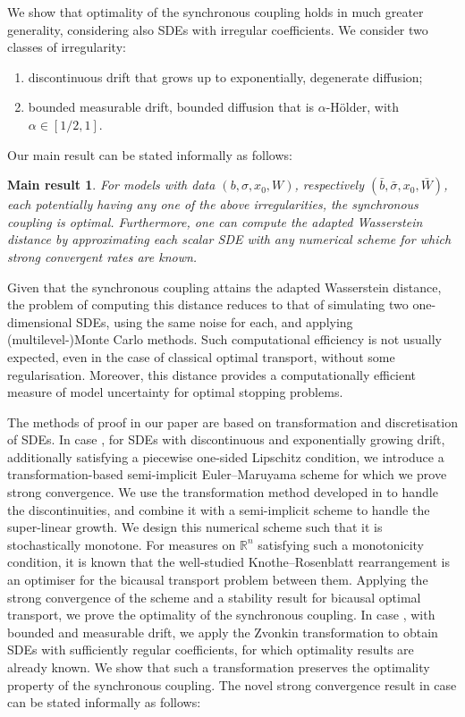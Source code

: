 \documentclass[onseside, final]{amsart}
\newtheorem*{mainresult*}{Main result}
\theoremstyle{definition}
\newcommand{\R}{\mathbb R}
\numberwithin{equation}{section}
\begin{document}
	We show that optimality of the synchronous coupling holds in much greater generality, considering also SDEs with irregular coefficients.
	We consider two classes of irregularity:
	\begin{enumerate}[label = (\arabic*)]
		\item \label{it:1} discontinuous drift that grows up to exponentially, degenerate diffusion;
		\item \label{it:2} bounded measurable drift, bounded diffusion that is $\alpha$-H\"older, with $\alpha \in [1/2,1]$.
	\end{enumerate}
	Our main result can be stated informally as follows:
	\begin{mainresult*}
		For models with data $(b,\sigma,x_0,W)$, respectively $(\bar b, \bar \sigma,x_0,\bar W)$, each potentially having any one of the above irregularities, the synchronous coupling is optimal. Furthermore, one can compute the adapted Wasserstein distance by approximating each scalar SDE with any numerical scheme for which strong convergent rates are known.
	\end{mainresult*}
		
	Given that the synchronous coupling attains the adapted Wasserstein distance, the problem of computing this distance reduces to that of simulating two one-dimensional SDEs, using the same noise for each, and applying (multilevel-)Monte Carlo methods. Such computational efficiency is not usually expected, even in the case of classical optimal transport, without some regularisation. Moreover, this distance provides a computationally efficient measure of model uncertainty for optimal stopping problems.
		
	The methods of proof in our paper are based on transformation and discretisation of SDEs. In case , for SDEs with discontinuous and exponentially growing drift, additionally satisfying a piecewise one-sided Lipschitz condition, we introduce a transformation-based semi-implicit Euler--Maruyama scheme for which we prove strong convergence. We use the transformation method developed in \citep{LeSz17} to handle the discontinuities, and combine it with a semi-implicit scheme to handle the super-linear growth. We design this numerical scheme such that it is stochastically monotone. For measures on $\R^n$ satisfying such a monotonicity condition, it is known that the well-studied Knothe--Rosenblatt rearrangement is an optimiser for the bicausal transport problem between them. Applying the strong convergence of the scheme and a stability result for bicausal optimal transport, we prove the optimality of the synchronous coupling. In case , with bounded and measurable drift, we apply the Zvonkin transformation to obtain SDEs with sufficiently regular coefficients, for which optimality results are already known. We show that such a transformation preserves the optimality property of the synchronous coupling. The novel strong convergence result in case  can be stated informally as follows:
\end{document}
